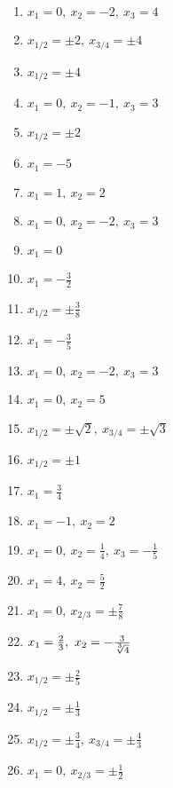 \newpage
\begin{Answer}[ref=ganzNSTA1]

	\begin{minipage}{\textwidth}
		\begin{minipage}{0.5\textwidth}
			\begin{enumerate}[label=\alph*)]
				\item \(x_1=0,\ x_2=-2,\ x_3=4\)
				\item \(x_{1/2}=\pm 2,\ x_{3/4}=\pm 4\)
				\item \(x_{1/2}=\pm 4\)
				\item \(x_1=0,\ x_2=-1,\ x_3=3\)
				\item \(x_{1/2}=\pm 2\)
				\item \(x_1=-5\)
				\item \(x_1=1,\ x_2=2\)
				\item \(x_1=0,\ x_2=-2,\ x_3=3\)
				\item \(x_1=0\)
				\item \(x_1=-\frac{3}{2}\)
				\item \(x_{1/2}=\pm \frac{3}{8}\)
				\item \(x_1=-\frac{3}{5}\)
				\item \(x_1=0,\ x_2=-2,\ x_3=3\)
			\end{enumerate}
		\end{minipage}%
		\begin{minipage}{0.5\textwidth}
			\begin{enumerate}[label=\alph*)]
				\setcounter{enumi}{13}
				\item \(x_1=0,\ x_2=5\)
				\item \(x_{1/2}=\pm \sqrt{2},\ x_{3/4}=\pm \sqrt{3}\)
				\item \(x_{1/2}=\pm 1\)
				\item \(x_1=\frac{3}{4}\)
				\item \(x_1=-1,\ x_2=2\)
				\item \(x_1=0,\ x_2=\frac{1}{4},\ x_3=-\frac{1}{5}\)
				\item \(x_1=4,\ x_2=\frac{5}{2}\)
				\item \(x_1=0,\ x_{2/3}=\pm \frac{7}{8}\)
				\item \(x_1=\frac{2}{3},\ x_2=-\frac{3}{\sqrt[\leftroot{0}\uproot{2}3]{4}}\)
				\item \(x_{1/2}=\pm\frac{2}{5}\)
				\item \(x_{1/2}=\pm\frac{1}{3}\)
				\item \(x_{1/2}=\pm\frac{3}{4},\ x_{3/4}=\pm\frac{4}{3}\)
				\item \(x_1=0,\ x_{2/3}=\pm\frac{1}{2}\)
			\end{enumerate}
		\end{minipage}%
	\end{minipage}
\end{Answer}